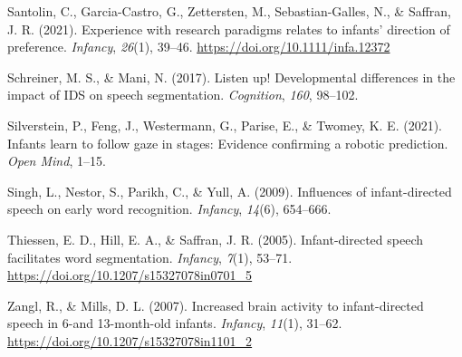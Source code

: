 \documentclass[
  english,
  man,floatsintext]{apa6}
\newlength{\cslhangindent}
\newlength{\cslentryspacingunit} %
\newenvironment{CSLReferences}[2] %
 {%
  \setlength{\parindent}{0pt}
  \ifodd #1
  \let\oldpar\par
  \def\par{\hangindent=\cslhangindent\oldpar}
  \fi
  \setlength{\parskip}{#2\cslentryspacingunit}
 }%
 {}
\begin{document}
\begin{CSLReferences}{1}{0}
\leavevmode{}%
Santolin, C., Garcia-Castro, G., Zettersten, M., Sebastian-Galles, N., \& Saffran, J. R. (2021). Experience with research paradigms relates to infants' direction of preference. \emph{Infancy}, \emph{26}(1), 39--46. \url{https://doi.org/10.1111/infa.12372}

\leavevmode{}%
Schreiner, M. S., \& Mani, N. (2017). Listen up! Developmental differences in the impact of IDS on speech segmentation. \emph{Cognition}, \emph{160}, 98--102.

\leavevmode{}%
Silverstein, P., Feng, J., Westermann, G., Parise, E., \& Twomey, K. E. (2021). Infants learn to follow gaze in stages: Evidence confirming a robotic prediction. \emph{Open Mind}, 1--15.

\leavevmode{}%
Singh, L., Nestor, S., Parikh, C., \& Yull, A. (2009). Influences of infant-directed speech on early word recognition. \emph{Infancy}, \emph{14}(6), 654--666.

\leavevmode{}%
Thiessen, E. D., Hill, E. A., \& Saffran, J. R. (2005). Infant-directed speech facilitates word segmentation. \emph{Infancy}, \emph{7}(1), 53--71. \url{https://doi.org/10.1207/s15327078in0701_5}

\leavevmode{}%
Zangl, R., \& Mills, D. L. (2007). Increased brain activity to infant-directed speech in 6-and 13-month-old infants. \emph{Infancy}, \emph{11}(1), 31--62. \url{https://doi.org/10.1207/s15327078in1101_2}

\end{CSLReferences}

\endgroup
\end{document}
